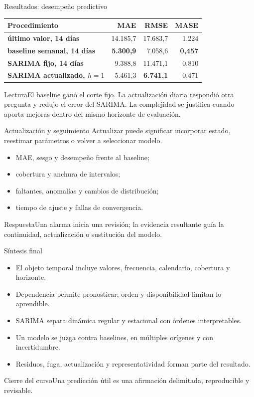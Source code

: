 \documentclass[aspectratio=169,10pt]{beamer}
\begin{document}
\begin{frame}{Resultados: desempeño predictivo}\scriptsize
\begin{tabularx}{\textwidth}{>{\bfseries}Xrrr}\toprule
Procedimiento & MAE & RMSE & MASE\\\midrule
último valor, 14 días & 14.185,7 & 17.683,7 & 1,224\\
baseline semanal, 14 días & \textbf{5.300,9} & 7.058,6 & \textbf{0,457}\\
SARIMA fijo, 14 días & 9.388,8 & 11.471,1 & 0,810\\
SARIMA actualizado, $h=1$ & 5.461,3 & \textbf{6.741,1} & 0,471\\\bottomrule
\end{tabularx}
\begin{alertblock}{Lectura}El baseline ganó el corte fijo. La actualización diaria respondió otra pregunta y redujo el error del SARIMA. La complejidad se justifica cuando aporta mejoras dentro del mismo horizonte de evaluación.\end{alertblock}
\end{frame}

\begin{frame}{Actualización y seguimiento}\small
Actualizar puede significar incorporar estado, reestimar parámetros o volver a seleccionar modelo.
\begin{itemize}\item MAE, sesgo y desempeño frente al baseline;\item cobertura y anchura de intervalos;\item faltantes, anomalías y cambios de distribución;\item tiempo de ajuste y fallas de convergencia.\end{itemize}
\begin{block}{Respuesta}Una alarma inicia una revisión; la evidencia resultante guía la continuidad, actualización o sustitución del modelo.\end{block}
\end{frame}

\begin{frame}{Síntesis final}\small
\begin{itemize}\item El objeto temporal incluye valores, frecuencia, calendario, cobertura y horizonte.\item Dependencia permite pronosticar; orden y disponibilidad limitan lo aprendible.\item SARIMA separa dinámica regular y estacional con órdenes interpretables.\item Un modelo se juzga contra baselines, en múltiples orígenes y con incertidumbre.\item Residuos, fuga, actualización y representatividad forman parte del resultado.\end{itemize}
\begin{block}{Cierre del curso}Una predicción útil es una afirmación delimitada, reproducible y revisable.\end{block}
\end{frame}
\end{document}
